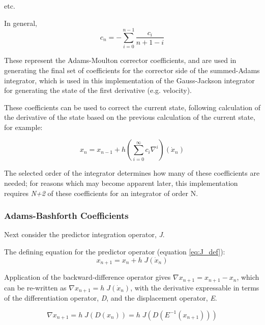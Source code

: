 etc.

In general,
\begin{equation}\label{eq:L_c_coeffs_eval}
 c_{n}=-\sum _{i=0}^{n-1}{\frac{c_{i}}{n+1-i}}
\end{equation}


These represent the Adams-Moulton corrector coefficients, and are used
in generating the final set of coefficients for the corrector side of
the summed-Adams integrator, which is used in this implementation of the 
Gauss-Jackson
integrator for generating the state of the first derivative (e.g. velocity).

These coefficients can be used to correct the current state, following
calculation of the derivative of the state based on the previous
calculation of the current state, for example:


\begin{equation} \label{eq:adams_moulton}
x_{n}=x_{n-1}+h\left(\sum _{i=0}^{\infty}c_{i}\nabla ^{i}\right)(\dot{x}_{n})
\end{equation}

The selected order of the integrator determines how many of
these coefficients are needed; for reasons which may become apparent
later, this implementation requires \textit{N+2} of these coefficients for
an integrator of order N.













\subsubsection{Adams-Bashforth Coefficients}

Next consider the predictor integration operator, \textit{J}.

The defining equation for the predictor operator (equation \ref{eq:J_def}):
\begin{equation*}
x_{n+1}=x_{n}+h\;J({\dot{x}}_{n})
\end{equation*}

Application of the backward-difference operator gives 
$\nabla x_{n+1} = x_{n+1}-x_{n}$, which can be re-written as 
$\nabla x_{n+1} = h\;J({\dot{x}}_{n})$, with the derivative expressable in 
terms of the 
 differentiation operator, \textit{D}, and the displacement operator, 
 \textit{E}.

\begin{equation*}
\nabla x_{n+1} = h\;J(D(x_{n})) = h\;J(D(E^{-1}(x_{n+1})))
\end{equation*}

